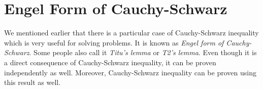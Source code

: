 \documentclass{subfile}
\begin{document}
	\chapter{Engel Form of Cauchy-Schwarz}\label{ch:engel}
	We mentioned earlier that there is a particular case of Cauchy-Schwarz inequality which is very useful for solving problems. It is known as \textit{Engel form of Cauchy-Schwarz}. Some people also call it \textit{Titu's lemma} or \textit{T2's lemma}. Even though it is a direct consequence of Cauchy-Schwarz inequality, it can be proven independently as well. Moreover, Cauchy-Schwarz inequality can be proven using this result as well.
\end{document}
